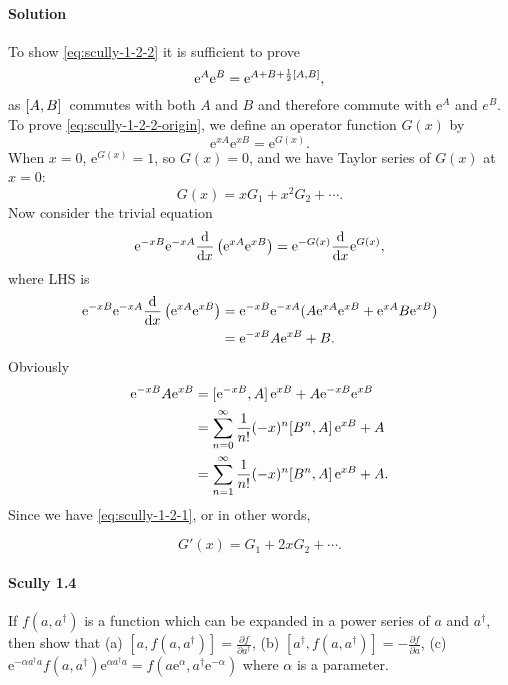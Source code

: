 \documentclass[hyperref, a4paper]{article}
\newcommand*{\ee}{\mathrm{e}}
\begin{document}
\paragraph{Solution} To show \eqref{eq:scully-1-2-2} it is sufficient to prove 
\begin{equation}
    \ee^{A} \ee^{B} = \ee^{A + B + \frac{1}{2} \comm*{A}{B}},
    \label{eq:scully-1-2-2-origin}
\end{equation}
as $\comm*{A}{B}$ commutes with both $A$ and $B$ and therefore commute with $\ee^A$ and $e^B$.
To prove \eqref{eq:scully-1-2-2-origin}, we define an operator function $G(x)$ by 
\begin{equation}
    \ee^{x A} \ee^{x B} = \ee^{G(x)}.
\end{equation}
When $x=0$, $\ee^{G(x)} = 1$, so $G(x) = 0$, and we have Taylor series of $G(x)$ at $x=0$:
\[
    G(x) = x G_1 + x^2 G_2 + \cdots.
\]
Now consider the trivial equation
\[
    \ee^{- xB} \ee^{- xA} \dv{x} \left( \ee^{x A} \ee^{x B} \right) = \ee^{-G(x)} \dv{x} \ee^{G(x)},
\]
where LHS is 
\[
    \begin{aligned}
        \ee^{- xB} \ee^{- xA} \dv{x} \left( \ee^{x A} \ee^{x B} \right) &=  \ee^{- xB} \ee^{- xA} (A \ee^{x A} \ee^{x B} + \ee^{x A} B \ee^{x B}) \\
        &= \ee^{-xB} A \ee^{xB} + B.
    \end{aligned}
\]
Obviously 
\[
    \begin{aligned}
        \ee^{-xB} A \ee^{xB} &= \comm*{\ee^{-xB}}{A} \ee^{xB} + A \ee^{-xB} \ee^{xB} \\
        &= \sum_{n=0}^\infty \frac{1}{n!} (-x)^n \comm*{B^n}{A} \ee^{xB} + A \\
        &= \sum_{n=1}^\infty \frac{1}{n!} (-x)^n \comm*{B^n}{A} \ee^{xB} + A.
    \end{aligned}
\]
Since we have \eqref{eq:scully-1-2-1}, or in other words,

\[
    G'(x) = G_1 + 2x G_2 + \cdots.
\]

\paragraph{Scully 1.4} If $f\left(a, a^{\dagger}\right)$ is a function which can be expanded in a power series of $a$ and $a^{\dagger}$, then show that
(a) $\left[a, f\left(a, a^{\dagger}\right)\right]=\frac{\partial f}{\partial a^{\dagger}}$,
(b) $\left[a^{\dagger}, f\left(a, a^{\dagger}\right)\right]=-\frac{\partial f}{\partial a}$,
(c) $\ee^{-\alpha a^{\dagger} a} f\left(a, a^{\dagger}\right) \ee^{\alpha a^{\dagger} a}=f\left(a \ee^{\alpha}, a^{\dagger} \ee^{-\alpha}\right)$
where $\alpha$ is a parameter.
\end{document}
